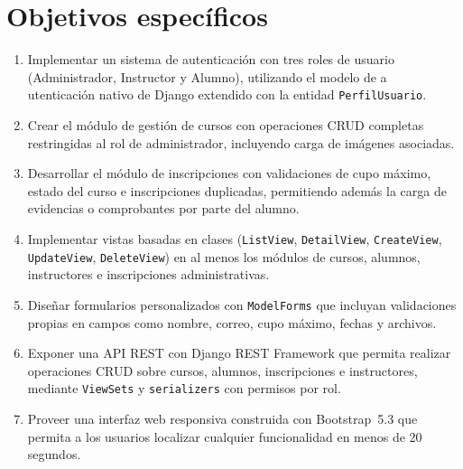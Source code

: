 \documentclass[11pt,letterpaper]{article}
\begin{document}
	\section{Objetivos espec\'ificos}
	\begin{enumerate}[leftmargin=*]
		\item Implementar un sistema de autenticaci\'on con tres roles de usuario (Administrador, Instructor y Alumno), utilizando el modelo de a\\
		utenticaci\'on nativo de Django extendido con la entidad \texttt{PerfilUsuario}.
		\item Crear el m\'odulo de gesti\'on de cursos con operaciones CRUD completas restringidas al rol de administrador, incluyendo carga de im\'agenes asociadas.
		\item Desarrollar el m\'odulo de inscripciones con validaciones de cupo m\'aximo, estado del curso e inscripciones duplicadas, permitiendo adem\'as la carga de evidencias o comprobantes por parte del alumno.
		\item Implementar vistas basadas en clases (\texttt{ListView}, \texttt{DetailView}, \texttt{CreateView}, \texttt{UpdateView}, \texttt{DeleteView}) en al menos los m\'odulos de cursos, alumnos, instructores e inscripciones administrativas.
		\item Dise\~nar formularios personalizados con \texttt{ModelForms} que incluyan validaciones propias en campos como nombre, correo, cupo m\'aximo, fechas y archivos.
		\item Exponer una API REST con Django REST Framework que permita realizar operaciones CRUD sobre cursos, alumnos, inscripciones e instructores, mediante \texttt{ViewSets} y \texttt{serializers} con permisos por rol.
		\item Proveer una interfaz web responsiva construida con Bootstrap~5.3 que permita a los usuarios localizar cualquier funcionalidad en menos de 20 segundos.
	\end{enumerate}
	
\end{document}
